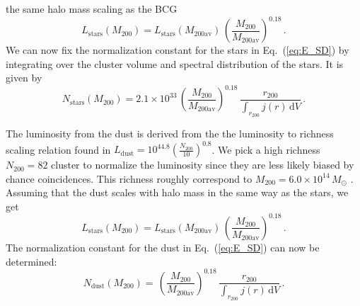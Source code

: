 \documentclass[10pt,aps,pra,reprint,amsmath,amsfonts,amssymb,showpacs,nofootinbib,floatfix]{revtex4-1}
\def\del#1{{}}
\newcommand{\rmn}{\mathrm}
\newcommand{\msun}{M_\odot}
\newcommand{\stars}{\rmn{stars}}
\newcommand{\dust}{\rmn{dust}}
\newcommand{\dd}{\rmn{d}}
\newcommand{\rvir}{r_{200}}
\newcommand{\mvir}{M_{200}}
\begin{document}
the same halo mass scaling as the BCG \cite{2010ApJ...713.1037H}
\begin{equation}
L_\stars(\mvir)=L_\stars(M_{200\rmn{av}})\,
\left(\frac{\mvir}{M_{200\rmn{av}}}\right)^{0.18}\,.
\end{equation} 
We can now fix the normalization constant for the stars in
Eq.~(\ref{eq:E_SD}) by integrating over the cluster volume and
spectral distribution of the stars. It is given by
\begin{equation}
 N_\stars(\mvir) = 2.1\times10^{33}\,
\left(\frac{\mvir}{M_{200\rmn{av}}}\right)^{0.18}\,
\frac{\rvir}{\int_{\rvir} j(r) \,\dd V}\,.
\label{eq:N_stars}
\end{equation}
\del{Note that since the luminosities include the contribution from
galaxies, we have integrated the spatial distribution including
galaxies to derive the normalization. Once the normalization is fixed,
the SD energy densities are derived from the spatial distribution
where galaxies have been excluded.}

The luminosity from the dust is derived from the the luminosity to
richness scaling relation found in \cite{2008A&A...490..547G}
$L_\dust=10^{44.8}\left(\frac{N_{200}}{10}\right)^{0.8}$. We pick a high
richness $N_{200}=82$ cluster to normalize the luminosity since they
are less likely biased by chance coincidences. This richness roughly
correspond to $\mvir=6.0\times10^{14}\,\msun$
\cite{2010ApJ...713.1037H}. Assuming that the dust scales with halo
mass in the same way as the stars, we get
\begin{equation}
L_\stars(\mvir)=L_\stars(M_{200\rmn{av}})\,
\left(\frac{\mvir}{M_{200\rmn{av}}}\right)^{0.18}\,.
\end{equation} 
The normalization constant for the dust in Eq.~(\ref{eq:E_SD}) can now
be determined:
\begin{equation}
 N_\dust(\mvir) =\,
\left(\frac{\mvir}{M_{200\rmn{av}}}\right)^{0.18}\,
\frac{\rvir}{\int_{\rvir} j(r) \,\dd V}\,.
\label{eq:N_dust}
\end{equation}
\end{document}
